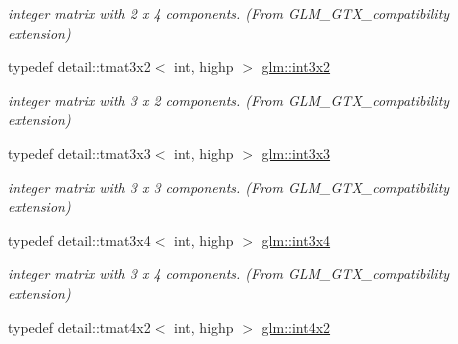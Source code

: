 \begin{CompactItemize}
\begin{CompactList}\small\item\em integer matrix with 2 x 4 components. (From GLM\_\-GTX\_\-compatibility extension) \item\end{CompactList}\item 
\hypertarget{group__gtx__compatibility_g2b1f3046fb4692c0c2f76b3933389868}{
typedef detail::tmat3x2$<$ int, highp $>$ \hyperlink{group__gtx__compatibility_g2b1f3046fb4692c0c2f76b3933389868}{glm::int3x2}}
\label{group__gtx__compatibility_g2b1f3046fb4692c0c2f76b3933389868}

\begin{CompactList}\small\item\em integer matrix with 3 x 2 components. (From GLM\_\-GTX\_\-compatibility extension) \item\end{CompactList}\item 
\hypertarget{group__gtx__compatibility_g8773c9f240dcac9f28d1afef71f7f779}{
typedef detail::tmat3x3$<$ int, highp $>$ \hyperlink{group__gtx__compatibility_g8773c9f240dcac9f28d1afef71f7f779}{glm::int3x3}}
\label{group__gtx__compatibility_g8773c9f240dcac9f28d1afef71f7f779}

\begin{CompactList}\small\item\em integer matrix with 3 x 3 components. (From GLM\_\-GTX\_\-compatibility extension) \item\end{CompactList}\item 
\hypertarget{group__gtx__compatibility_g7cb1c0960d6551c34c666ad5829e9c65}{
typedef detail::tmat3x4$<$ int, highp $>$ \hyperlink{group__gtx__compatibility_g7cb1c0960d6551c34c666ad5829e9c65}{glm::int3x4}}
\label{group__gtx__compatibility_g7cb1c0960d6551c34c666ad5829e9c65}

\begin{CompactList}\small\item\em integer matrix with 3 x 4 components. (From GLM\_\-GTX\_\-compatibility extension) \item\end{CompactList}\item 
\hypertarget{group__gtx__compatibility_gc391157aca117c5d52b10c2c3ca5c9be}{
typedef detail::tmat4x2$<$ int, highp $>$ \hyperlink{group__gtx__compatibility_gc391157aca117c5d52b10c2c3ca5c9be}{glm::int4x2}}
\label{group__gtx__compatibility_gc391157aca117c5d52b10c2c3ca5c9be}


\end{CompactItemize}
